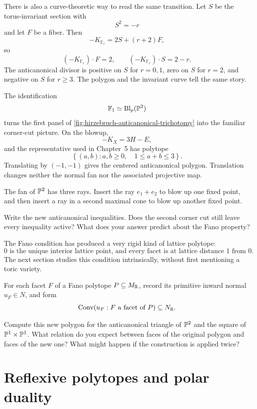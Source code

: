 There is also a curve-theoretic way to read the same transition. Let
\(S\) be the torus-invariant section with
\[
S^2=-r
\]
and let \(F\) be a fiber. Then
\[
-K_{\mathbb F_r}=2S+(r+2)F,
\]
so
\[
(-K_{\mathbb F_r})\cdot F=2,
\qquad
(-K_{\mathbb F_r})\cdot S=2-r.
\]
The anticanonical divisor is positive on \(S\) for \(r=0,1\), zero
on \(S\) for \(r=2\), and negative on \(S\) for \(r\geq3\). The
polygon and the invariant curve tell the same story.

\begin{surfacelaboratory}
The identification
\[
\mathbb F_1\simeq\Blp{\PP^2}{p}
\]
turns the first panel of \cref{fig:hirzebruch-anticanonical-trichotomy}
into the familiar corner-cut picture. On the blowup,
\[
-K_X=3H-E,
\]
and the representative used in Chapter~5 has polytope
\[
\left\{
(a,b):a,b\geq0,
\quad
1\leq a+b\leq3
\right\}.
\]
Translating by \((-1,-1)\) gives the centered anticanonical polygon.
Translation changes neither the normal fan nor the associated
projective map.
\end{surfacelaboratory}

\begin{pauseandthink}
The fan of \(\PP^2\) has three rays. Insert the ray \(e_1+e_2\) to
blow up one fixed point, and then insert a ray in a second maximal cone
to blow up another fixed point.

Write the new anticanonical inequalities. Does the second corner cut
still leave every inequality active? What does your answer predict
about the Fano property?
\end{pauseandthink}

The Fano condition has produced a very rigid kind of lattice polytope:
\[
\boxed{
0\text{ is the unique interior lattice point, and every facet is at
lattice distance }1\text{ from }0.
}
\]
The next section studies this condition intrinsically, without first
mentioning a toric variety.

\begin{prediction}
For each facet \(F\) of a Fano polytope \(P\subseteq M_\RR\), record
its primitive inward normal \(u_F\in N\), and form
\[
\Conv(u_F:F\text{ a facet of }P)\subseteq N_\RR.
\]

Compute this new polygon for the anticanonical triangle of \(\PP^2\)
and the square of \(\PP^1\times\PP^1\). What relation do you expect
between faces of the original polygon and faces of the new one? What
might happen if the construction is applied twice?
\end{prediction}
\section{Reflexive polytopes and polar duality}
\label{sec:reflexive-polytopes-polar-duality}

